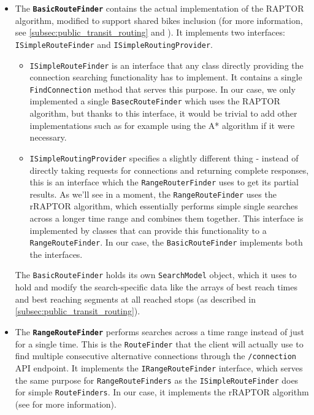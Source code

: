 \begin{itemize}
    \item The \textbf{\texttt{BasicRouteFinder}} contains the actual implementation of the RAPTOR algorithm, modified to support shared bikes inclusion (for more information, see \cref{subsec:public_transit_routing} and \textcite{delling2015raptor}). It implements two interfaces: \texttt{ISimpleRouteFinder} and \texttt{ISimpleRoutingProvider}. 
    \begin{itemize}
        \item \texttt{ISimpleRouteFinder} is an interface that any class directly providing the connection searching functionality has to implement. It contains a single \texttt{FindConnection} method that serves this purpose. In our case, we only implemented a single \texttt{BasecRouteFinder} which uses the RAPTOR algorithm, but thanks to this interface, it would be trivial to add other implementations such as for example using the A* algorithm if it were necessary.
        \item \texttt{ISimpleRoutingProvider} specifies a slightly different thing - instead of directly taking requests for connections and returning complete responses, this is an interface which the \texttt{RangeRouterFinder} uses to get its partial results. As we'll see in a moment, the \texttt{RangeRouteFinder} uses the rRAPTOR algorithm, which essentially performs simple single searches across a longer time range and combines them together. This interface is implemented by classes that can provide this functionality to a \texttt{RangeRouteFinder}. In our case, the \texttt{BasicRouteFinder} implements both the interfaces.
    \end{itemize}
    The \texttt{BasicRouteFinder} holds its own \texttt{SearchModel} object, which it uses to hold and modify the search-specific data like the arrays of best reach times and best reaching segments at all reached stops (as described in \cref{subsec:public_transit_routing}).
    \item The \textbf{\texttt{RangeRouteFinder}} performs searches across a time range instead of just for a single time. This is the \texttt{RouteFinder} that the client will actually use to find multiple consecutive alternative connections through the \texttt{/connection} API endpoint. It implements the \texttt{IRangeRouteFinder} interface, which serves the same purpose for \texttt{RangeRouteFinders} as the \texttt{ISimpleRouteFinder} does for simple \texttt{RouteFinders}. In our case, it implements the rRAPTOR algorithm (see \textcite{delling2015raptor} for more information).


\end{itemize}
